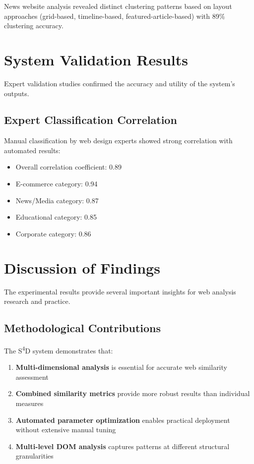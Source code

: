 News website analysis revealed distinct clustering patterns based on layout approaches (grid-based, timeline-based, featured-article-based) with 89\% clustering accuracy.

\section{System Validation Results}
\label{sec:validation-results}

Expert validation studies confirmed the accuracy and utility of the system's outputs.

\subsection{Expert Classification Correlation}
\label{subsec:expert-correlation}

Manual classification by web design experts showed strong correlation with automated results:
\begin{itemize}
    \item Overall correlation coefficient: 0.89
    \item E-commerce category: 0.94
    \item News/Media category: 0.87
    \item Educational category: 0.85
    \item Corporate category: 0.86
\end{itemize}

\section{Discussion of Findings}
\label{sec:findings-discussion}

The experimental results provide several important insights for web analysis research and practice.

\subsection{Methodological Contributions}
\label{subsec:methodological-contributions}

The S\textsuperscript{4}D system demonstrates that:

\begin{enumerate}
    \item \textbf{Multi-dimensional analysis} is essential for accurate web similarity assessment
    \item \textbf{Combined similarity metrics} provide more robust results than individual measures
    \item \textbf{Automated parameter optimization} enables practical deployment without extensive manual tuning
    \item \textbf{Multi-level DOM analysis} captures patterns at different structural granularities
\end{enumerate}

